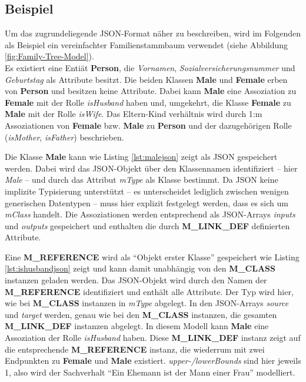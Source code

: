 \subsection{Beispiel}\label{subsec:beispiel}
Um das zugrundeliegende JSON-Format n\"aher zu beschreiben, wird im Folgenden als Beispiel ein vereinfachter Familienstammbaum verwendet (siehe Abbildung \ref{fig:Family-Tree-Model}).\\ 
Es existiert eine Entiät \textbf{Person}, die \textit{Vornamen}, \textit{Sozialversicherungsnummer} und \textit{Geburtstag} als Attribute besitzt. Die beiden Klassen \textbf{Male} und \textbf{Female} erben von \textbf{Person} und besitzen keine Attribute. Dabei kann \textbf{Male} eine Assoziation zu \textbf{Female} mit der Rolle \textit{isHusband} haben und, umgekehrt, die Klasse \textbf{Female} zu \textbf{Male} mit der Rolle \textit{isWife}. Das Eltern-Kind verh\"altnis wird durch 1:m Assoziationen von \textbf{Female} bzw. \textbf{Male} zu \textbf{Person} und der dazugeh\"origen Rolle (\textit{isMother}, \textit{isFather}) beschrieben.



Die Klasse \textbf{Male} kann wie Listing \ref{lst:malejson} zeigt als JSON gespeichert werden. Dabei wird das JSON-Objekt \"uber den Klassennamen identifiziert -- hier \textit{Male} -- und durch das Attribut \textit{mType} als Klasse bestimmt. Da JSON keine implizite Typisierung unterstützt -- es unterscheidet lediglich zwischen wenigen generischen Datentypen -- muss hier explizit festgelegt werden, dass es sich um \textit{mClass} handelt. Die Assoziationen werden entsprechend als JSON-Arrays \textit{inputs} und \textit{outputs} gespeichert und enthalten die durch \textbf{M\_LINK\_DEF} definierten Attribute.



Eine \textbf{M\_REFERENCE} wird als "`Objekt erster Klasse"' gespeichert wie Listing \ref{lst:ishusbandjson} zeigt und kann damit unabhängig von den \textbf{M\_CLASS} instanzen geladen werden. Das JSON-Objekt wird durch den Namen der \textbf{M\_REFERENCE} identifiziert und enth\"alt alle Attribute. Der Typ wird hier, wie bei \textbf{M\_CLASS} instanzen in \textit{mType} abgelegt. In den JSON-Arrays \textit{source} und \textit{target} werden, genau wie bei den \textbf{M\_\-CLASS} instanzen, die gesamten \textbf{M\_LINK\_DEF} instanzen abgelegt. In diesem Modell kann \textbf{Male} eine Assoziation der Rolle \textit{isHusband} haben. Diese \textbf{M\_LINK\_DEF} instanz zeigt auf die entsprechende \textbf{M\_REFERENCE} instanz, die wiederrum mit zwei Endpunkten zu \textbf{Female} und \textbf{Male} existiert. \textit{upper-/lowerBounds} sind hier jeweils 1, also wird der Sachverhalt "`Ein Ehemann ist der Mann einer Frau"' modelliert.

